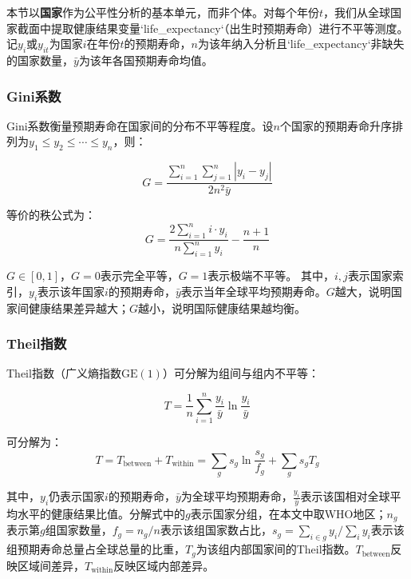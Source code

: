 \documentclass[12pt,a4paper]{ctexart}
\begin{document}
本节以\textbf{国家}作为公平性分析的基本单元，而非个体。对每个年份$t$，我们从全球国家截面中提取健康结果变量`life\_expectancy`（出生时预期寿命）进行不平等测度。记$y_i$或$y_{it}$为国家$i$在年份$t$的预期寿命，$n$为该年纳入分析且`life\_expectancy`非缺失的国家数量，$\bar{y}$为该年各国预期寿命均值。

\subsubsection{Gini系数}

Gini系数衡量预期寿命在国家间的分布不平等程度。设$n$个国家的预期寿命升序排列为$y_1 \leq y_2 \leq \cdots \leq y_n$，则：

\begin{equation}
\label{eq:gini}
    G = \frac{\sum_{i=1}^{n}\sum_{j=1}^{n}|y_i - y_j|}{2n^2 \bar{y}}
\end{equation}

等价的秩公式为：
\begin{equation}
    G = \frac{2\sum_{i=1}^{n} i \cdot y_i}{n \sum_{i=1}^{n} y_i} - \frac{n+1}{n}
\end{equation}

$G \in [0, 1]$，$G = 0$表示完全平等，$G = 1$表示极端不平等。
其中，$i,j$表示国家索引，$y_i$表示该年国家$i$的预期寿命，$\bar{y}$表示当年全球平均预期寿命。$G$越大，说明国家间健康结果差异越大；$G$越小，说明国际健康结果越均衡。

\subsubsection{Theil指数}

Theil指数（广义熵指数$\text{GE}(1)$）可分解为组间与组内不平等：

\begin{equation}
\label{eq:theil}
    T = \frac{1}{n}\sum_{i=1}^{n}\frac{y_i}{\bar{y}}\ln\frac{y_i}{\bar{y}}
\end{equation}

可分解为：
\begin{equation}
    T = T_{\text{between}} + T_{\text{within}} = \sum_{g} s_g \ln\frac{s_g}{f_g} + \sum_{g} s_g T_g
\end{equation}

其中，$y_i$仍表示国家$i$的预期寿命，$\bar{y}$为全球平均预期寿命，$\frac{y_i}{\bar{y}}$表示该国相对全球平均水平的健康结果比值。分解式中的$g$表示国家分组，在本文中取WHO地区；$n_g$表示第$g$组国家数量，$f_g = n_g / n$表示该组国家数占比，$s_g = \sum_{i \in g} y_i / \sum_i y_i$表示该组预期寿命总量占全球总量的比重，$T_g$为该组内部国家间的Theil指数。$T_{\text{between}}$反映区域间差异，$T_{\text{within}}$反映区域内部差异。
\end{document}
